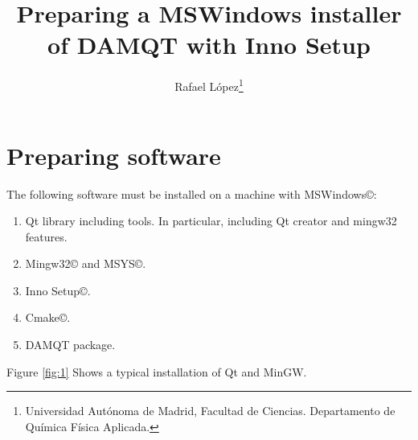 \documentclass[a4paper,10pt]{article}
\begin{document}
\renewcommand{\baselinestretch}{1.25}
 
\title{Preparing a MSWindows installer of DAMQT with Inno Setup}
\author{
Rafael L\'opez\footnote{Universidad Aut\'onoma de
Madrid,
Facultad de Ciencias. Departamento de Qu\'{i}mica F\'{i}sica Aplicada.}{ }}

\maketitle

\large

\section{Preparing software}

The following software must be installed on a machine with MSWindows\copyright:

\begin{enumerate}
\item Qt library including tools. In particular, including Qt creator and mingw32 features.
 
\item Mingw32\copyright{ } and MSYS\copyright.

\item Inno Setup\copyright.

\item Cmake\copyright.

\item DAMQT package.
\end{enumerate}

Figure \ref{fig:1} Shows a typical installation of Qt and MinGW.
\end{document}
